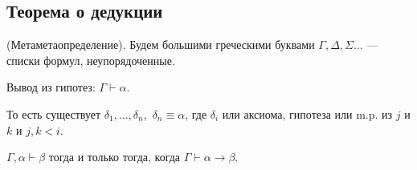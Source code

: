 \subsection{Теорема о дедукции}

\begin{definition}
    (Метаметаопределение).
    Будем большими греческими буквами $\Gamma, \Delta, \Sigma\ldots$ --- списки формул, неупорядоченные.
\end{definition}

\begin{definition}
    Вывод из гипотез: $\Gamma \vdash \alpha$.

    То есть существует $\delta_1,\dots, \delta_n$,~$\delta_n \equiv \alpha$, где $\delta_i$ или аксиома, гипотеза или m.p. из $j$ и $k$ и $j, k < i$.
\end{definition}

\begin{theorem}
    $ \Gamma, \alpha \vdash \beta$ тогда и только тогда, когда $\Gamma \vdash \alpha \to \beta$.
\end{theorem}

